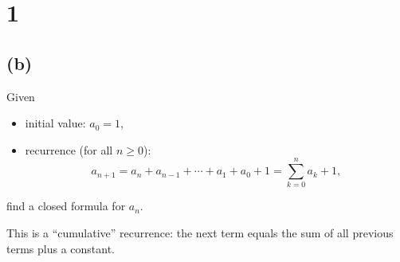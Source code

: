 \documentclass[12pt,a4paper]{article}
\theoremstyle{definition}
\theoremstyle{remark}
\begin{document}
\section*{1}
\subsection*{(b)}


Given
\begin{itemize}
    \item initial value: $a_0=1$,
    \item recurrence (for all $n\ge 0$):
    $$a_{n+1}=a_n+a_{n-1}+\cdots+a_1+a_0+1=\sum_{k=0}^{n} a_k + 1,$$
\end{itemize}
find a closed formula for $a_n$.

This is a ``cumulative'' recurrence: the next term equals the sum of all previous terms plus a constant.
\end{document}
